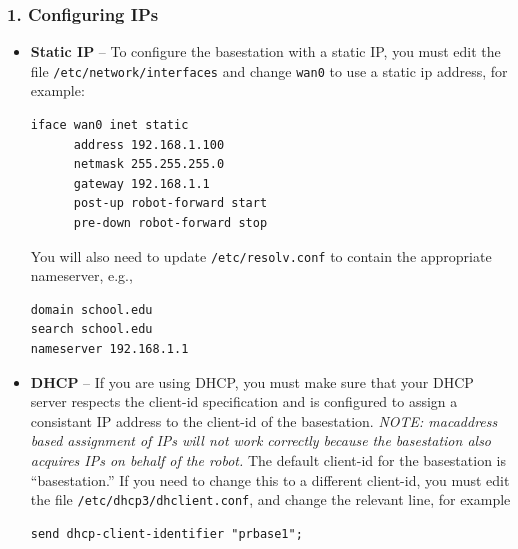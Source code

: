 \subsubsection{1. Configuring IPs}

\begin{itemize}
\item \textbf{Static IP} -- To configure the basestation with a static IP, you must edit the file
\texttt{/etc/network/interfaces} and change \texttt{wan0} to use a static ip
address, for example:
\begin{verbatim}
iface wan0 inet static
      address 192.168.1.100
      netmask 255.255.255.0
      gateway 192.168.1.1
      post-up robot-forward start
      pre-down robot-forward stop
\end{verbatim}

You will also need to update \texttt{/etc/resolv.conf} to contain the
appropriate nameserver, e.g.,
\begin{verbatim}
domain school.edu
search school.edu
nameserver 192.168.1.1
\end{verbatim}

\item \textbf{DHCP} -- If you are using DHCP, you must make sure that your DHCP server
respects the client-id specification and is configured to assign a
consistant IP address to the client-id of the basestation.
\textit{NOTE: macaddress based assignment of IPs will not work
  correctly because the basestation also acquires IPs on behalf of the
  robot.}  The default client-id for the basestation is
``basestation.''  If you need to change this to a different client-id,
you must edit the file \texttt{/etc/dhcp3/dhclient.conf}, and change
the relevant line, for example
\begin{verbatim}
send dhcp-client-identifier "prbase1";
\end{verbatim}
\end{itemize}

